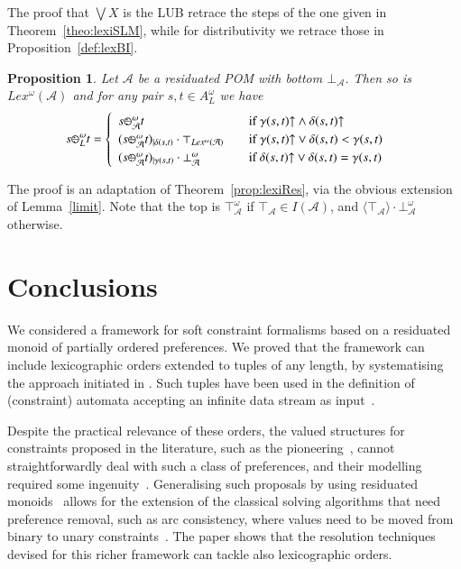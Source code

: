 \documentclass[a4paper]{elsarticle}
\newtheorem{proposition}{Proposition}
\newcommand{\1}{\mathbf{1}}
\def\odiv{{ \ominus\hspace{-8pt}:}\;}
\begin{document}
	The proof that $\bigvee X$ is the LUB retrace the steps of the one given in 
	Theorem~\ref{theo:lexiSLM}, while for distributivity we retrace those in Proposition~\ref{def:lexBI}.

\begin{proposition}\label{prop:lexiResOmega}
	Let $\mathcal{A}$ be a residuated POM with bottom $\bot_\mathcal{A}$.
	Then so is $Lex^\omega(\mathcal{A})$
	and for any pair $s, t \in A^\omega_L$ we have
	\[
	s \odiv^\omega_L t = 	\begin{cases}
	\begin{array}{lcl}
	s \odiv^\omega_\mathcal{A} t & & \mbox{if  } \gamma(s,t){\uparrow} \wedge \delta(s,t){\uparrow} \\
	(s \odiv^\omega_\mathcal{A} t)_{\mid \delta(s,t)} \cdot \top_{Lex^\omega(\mathcal{A})} & &  \mbox{if  } \gamma(s,t){\uparrow} \vee \delta(s,t) < \gamma(s,t) \\
	(s \odiv^\omega_\mathcal{A} t)_{\mid \gamma(s,t)} \cdot \bot^\omega_\mathcal{A} & & \mbox{if  } \delta(s,t){\uparrow} \vee \delta(s,t) = \gamma(s,t)
	\end{array}
	\end{cases}
	\]
\end{proposition}

The proof is an adaptation of Theorem~\ref{prop:lexiRes}, via the obvious extension of Lemma~\ref{limit}.
Note that the top is $\top_\mathcal{A}^\omega$
if $\top_\mathcal{A} \in I(\mathcal{A})$, and  $\langle \top_\mathcal{A} \rangle \cdot \bot_\mathcal{A}^\omega$ otherwise.

\section{Conclusions}\label{sec:conclusion}
We considered a framework for soft constraint formalisms based on a residuated monoid of partially ordered preferences.  
%
We proved that the framework can include lexicographic orders extended to tuples of any length, by systematising the approach initiated in \cite{sca}.
Such tuples have been used in the definition of (constraint) automata accepting an infinite data stream as input~\cite{sca}.

Despite the practical relevance of these orders, the valued structures for constraints proposed in the literature, 
such as the pioneering~\cite{jacm97,schiex}, cannot straightforwardly deal 
with such a class of preferences, and their modelling required some ingenuity~\cite{GadducciHMW13,valuation}. 
%
Generalising such proposals by using residuated monoids~\cite{residuation1} allows for the extension of the classical solving algorithms 
that need preference removal, such as arc consistency, where values need to be moved from binary to unary constraints~\cite{ipl}.
%
The paper shows that the resolution techniques devised for this richer framework can tackle also lexicographic orders.
\end{document}
